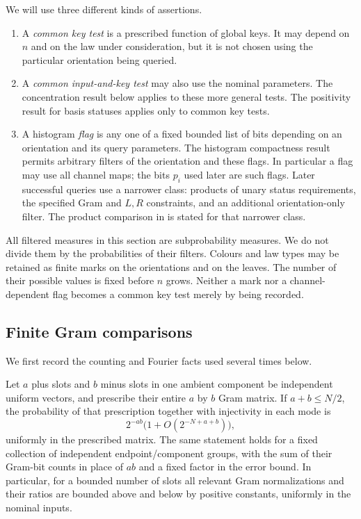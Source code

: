 We will use three different kinds of assertions.
\begin{enumerate}[label=(\roman*)]
\item A \emph{common key test} is a prescribed function of global keys.
It may depend on $n$ and on the law under consideration, but it is not
chosen using the particular orientation being queried.
\item A \emph{common input-and-key test} may also use the nominal
parameters. The concentration result below applies to these more
general tests. The positivity result for basis statuses applies only to
common key tests.
\item A histogram \emph{flag} is any one of a fixed bounded list of bits
depending on an orientation and its query parameters. The histogram
compactness result permits arbitrary filters of the orientation and
these flags. In particular a flag may use all channel maps; the bits
$p_i$ used later are such flags. Later successful queries use a narrower class: products of
unary status requirements, the specified Gram and $L,R$ constraints,
and an additional orientation-only filter. The product comparison in
 is stated for that narrower class.
\end{enumerate}
All filtered measures in this section are subprobability measures. We do
not divide them by the probabilities of their filters.
Colours and law types may be retained as finite marks on the
orientations and on the leaves.  The number of their possible values
is fixed before $n$ grows.  Neither a mark nor a channel-dependent
flag becomes a common key test merely by being recorded.

\subsection{Finite Gram comparisons}

We first record the counting and Fourier facts used several times below.

\begin{lemma}\label{lem:histogram-gram-normalization}
Let $a$ plus slots and $b$ minus slots in one ambient component be
independent uniform vectors, and prescribe their entire $a$ by $b$ Gram
matrix. If $a+b\le N/2$, the probability of that prescription together
with injectivity in each mode is
\[
 2^{-ab}\bigl(1+O(2^{-N+a+b})\bigr),
\]
uniformly in the prescribed matrix. The same statement holds for a
fixed collection of independent endpoint/component groups, with the
sum of their Gram-bit counts in place of $ab$ and a fixed factor in the
error bound. In particular, for a bounded number of slots all relevant
Gram normalizations and their ratios are bounded above and below by
positive constants, uniformly in the nominal inputs.
\end{lemma}

